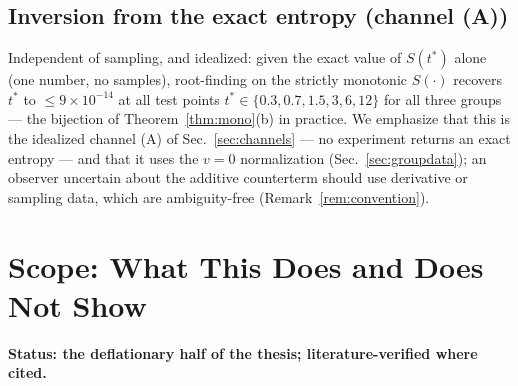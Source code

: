 \documentclass[11pt]{article}
\theoremstyle{remark}
\theoremstyle{plain}
\begin{document}
\subsection{Inversion from the exact entropy (channel (A))}\label{sec:inversion}

Independent of sampling, and idealized: given the exact value of $S(t^*)$ alone (one number, no samples), root-finding on the strictly monotonic $S(\cdot)$ recovers $t^*$ to $\leq 9\times10^{-14}$ at all test points $t^* \in \{0.3, 0.7, 1.5, 3, 6, 12\}$ for all three groups --- the bijection of Theorem~\ref{thm:mono}(b) in practice. We emphasize that this is the idealized channel (A) of Sec.~\ref{sec:channels} --- no experiment returns an exact entropy --- and that it uses the $v = 0$ normalization (Sec.~\ref{sec:groupdata}); an observer uncertain about the additive counterterm should use derivative or sampling data, which are ambiguity-free (Remark~\ref{rem:convention}).

\section{Scope: What This Does and Does Not Show}\label{sec:scope}

\textbf{Status: the deflationary half of the thesis; literature-verified where cited.}
\end{document}
